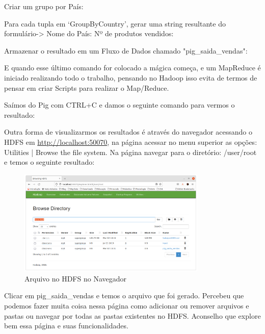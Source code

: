 \documentclass[a4paper,11pt]{article}
\begin{document}
Criar um grupo por País: \\

Para cada tupla em ‘GroupByCountry’, gerar uma string resultante do formulário-> Nome do País: Nº de produtos vendidos: \\

Armazenar o resultado em um Fluxo de Dados chamado "pig\_saida\_vendas": \\

E quando esse último comando for colocado a mágica começa, e um MapReduce é iniciado realizando todo o trabalho, pensando no Hadoop isso evita de termos de pensar em criar Scripts para realizar o Map/Reduce.

Saímos do Pig com CTRL+C e damos o seguinte comando para vermos o resultado: \\

Outra forma de visualizarmos os resultados é através do navegador acessando o HDFS em \url{http://localhost:50070}, na página acessar no menu superior as opções: Utilities | Browse the file system. Na página navegar para o diretório: /user/root e temos o seguinte resultado:
\begin{figure}[H]
	\centering
	\includegraphics[width=0.8\textwidth]{imagem/hdfsbrowser}
	\caption{Arquivo no HDFS no Navegador}
\end{figure}

Clicar em pig\_saida\_vendas e temos o arquivo que foi gerado. Percebeu que podemos fazer muita coisa nessa página como adicionar ou remover arquivos e pastas ou navegar por todas as pastas existentes no HDFS. Aconselho que explore bem essa página e suas funcionalidades.
\end{document}
